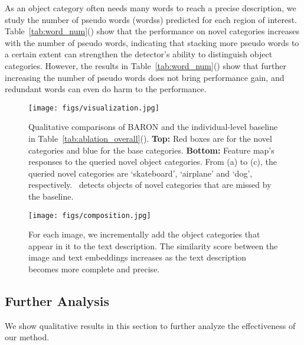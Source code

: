  As an object category often needs many words to reach a precise description, we study the number of pseudo words (wordss) predicted for each region of interest. Table~\ref{tab:word_num}() show that the performance on novel categories increases with the number of pseudo words, indicating that stacking more pseudo words to a certain extent can strengthen the detector's ability to distinguish object categories. However, the results in Table~\ref{tab:word_num}() show that further increasing the number of pseudo words does not bring performance gain, and redundant words can even do harm to the performance.


\begin{figure*}[ht]
    \centering
    \texttt{[image: figs/visualization.jpg]}
    \vspace{-24pt}
    \caption{Qualitative comparisons of BARON and the individual-level baseline in Table~\ref{tab:ablation_overall}().
    \textbf{Top:} Red boxes are for the novel categories and blue for the base categories. \textbf{Bottom:} Feature map's responses to the queried novel object categories. From (a) to (c), the queried novel categories are `skateboard', `airplane' and `dog', respectively. 
    \method~detects objects of novel categories that are missed by the baseline. 
    }
    \label{fig:vis}
    \vspace{-13pt}
\end{figure*}


\begin{figure}[h]
    \centering
    \texttt{[image: figs/composition.jpg]}
    \vspace{-12pt}
    \caption{For each image, we incrementally add the object categories that appear in it to the text description. The similarity score between the image and text embeddings increases as the text description becomes more complete and precise.}
    \label{fig:motivation}
 \vspace{-7pt}
\end{figure}

\subsection{Further Analysis}
We show qualitative results in this section to further analyze the effectiveness of our method.

